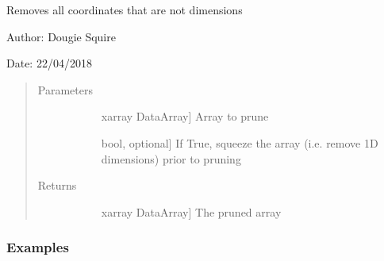\documentclass[letterpaper,10pt,english]{sphinxmanual}
\begin{document}
\begin{fulllineitems}
\label{\detokenize{utils_doc:utils.prune}}
Removes all coordinates that are not dimensions

\begin{DUlineblock}{0em}
\item[] Author: Dougie Squire
\item[] Date: 22/04/2018
\end{DUlineblock}
\begin{quote}\begin{description}
\item[{Parameters}] \leavevmode\begin{description}
\item[{}] \leavevmode{[}xarray DataArray{]}
Array to prune

\item[{}] \leavevmode{[}bool, optional{]}
If True, squeeze the array (i.e. remove 1D dimensions) prior to pruning

\end{description}

\item[{Returns}] \leavevmode\begin{description}
\item[{}] \leavevmode{[}xarray DataArray{]}
The pruned array

\end{description}

\end{description}\end{quote}
\subsubsection*{Examples}


\end{fulllineitems}
\end{document}
